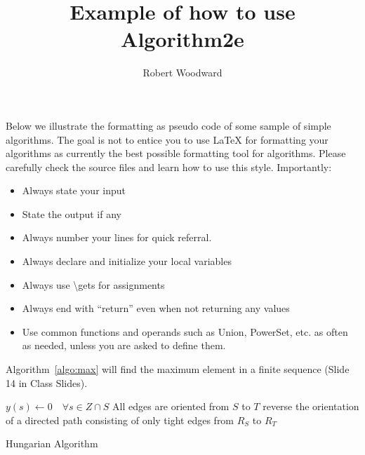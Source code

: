 \documentclass{article}
\title{Example of how to use Algorithm2e}
\author{Robert Woodward}
\begin{document}
\maketitle

Below we illustrate the formatting as pseudo code of some sample
of simple algorithms. The goal is not to entice you to use
\LaTeX\/ for formatting your algorithms as currently the best
possible formatting tool for algorithms. Please carefully check
the source files and learn how to use this style. Importantly:
\begin{itemize}
\item
Always state your input
\item
State the output if any
\item
Always number your lines for quick referral.
\item
Always declare and initialize your local variables
\item
Always use \textbackslash gets for assignments
\item
Always end with ``return'' even when not returning any values
\item
Use common functions and operands such as {\sc Union}, {\sc PowerSet}, etc. as often as needed, unless you are asked to define them.
\end{itemize}

Algorithm~\ref{algo:max} will find
the maximum element in a finite sequence (Slide 14 in Class Slides).
\begin{algorithm}
\DontPrintSemicolon %
$y(s) \leftarrow 0 \quad \forall s \in Z \cap S$\;
All edges are oriented from $S$ to $T$\;
 {
   {
    reverse the orientation of a directed path consisting of only tight edges from $R_S$ to $R_T$\;
  }
}

\;
\caption{Hungarian Algorithm}
\label{algo:hungarian}
\end{algorithm}
\end{document}
